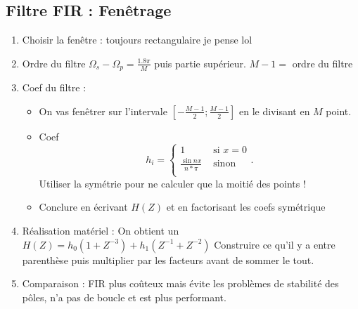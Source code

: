 \documentclass{article}
\begin{document}
\subsection{Filtre FIR : Fenêtrage}
\begin{enumerate}
    \item Choisir la fenêtre : toujours rectangulaire je pense lol
    \item Ordre du filtre $ \Omega _s - \Omega _p = \frac{1.8 \pi }{M} $ puis partie supérieur. $ M - 1 =  $ ordre du filtre
    \item Coef du filtre : \begin{itemize}
        \item On vas fenêtrer sur l'intervale $ [-\frac{M-1}{2} ; \frac{M-1}{2}] $ en le divisant en $ M $ point.
        \item Coef 
        \[
            h_i = \begin{cases}
                1 &\text{ si } x = 0\\
                \frac{\sin nx}{n*\pi } &\text{ sinon}\\
                \end{cases}  
        .\]
        Utiliser la symétrie pour ne calculer que la moitié des points !
        \item Conclure en écrivant $ H(Z) $ et en factorisant les coefs symétrique
    \end{itemize}
    \item Réalisation matériel : On obtient un $ H(Z) = h_0(1+Z^{-3}) + h_1 (Z^{-1} + Z^{-2})$ Construire ce qu'il y a entre parenthèse puis multiplier par les facteurs avant de sommer le tout.
    \item Comparaison : FIR plus coûteux mais évite les problèmes de stabilité des pôles, n'a pas de boucle et est plus performant.
\end{enumerate}
\end{document}
